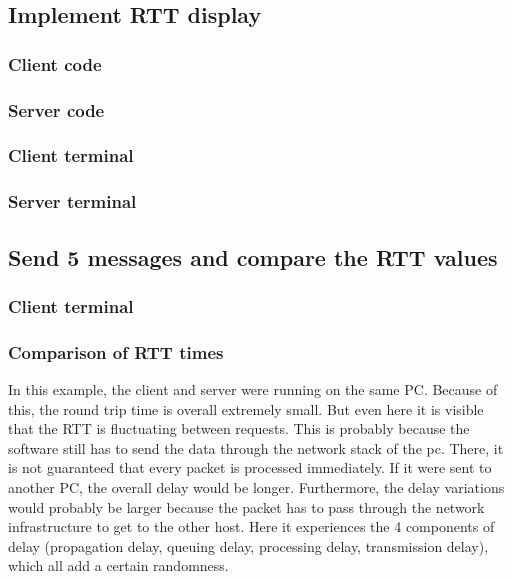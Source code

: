 \documentclass[a4paper,12pt]{article}
\begin{document}
\subsection{Implement RTT display}

\subsubsection{Client code}

\subsubsection{Server code}

\subsubsection{Client terminal}

\subsubsection{Server terminal}

\subsection{Send 5 messages and compare the RTT values}

\subsubsection{Client terminal}

\subsubsection{Comparison of RTT times}
In this example, the client and server were running on the same PC.
Because of this, the round trip time is overall extremely small.
But even here it is visible that the RTT is fluctuating between requests.
This is probably because the software still has to send the data through the network stack of the pc.
There, it is not guaranteed that every packet is processed immediately.
If it were sent to another PC, the overall delay would be longer.
Furthermore, the delay variations would probably be larger because the packet has to pass through the network infrastructure to get to the other host.
Here it experiences the 4 components of delay (propagation delay, queuing delay, processing delay, transmission delay), which all add a certain randomness.
\end{document}

